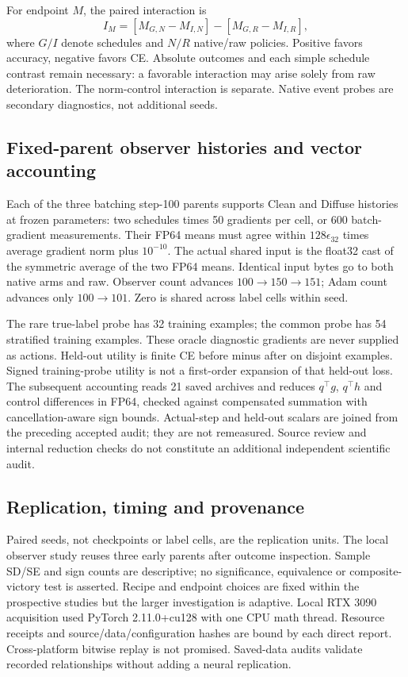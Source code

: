\documentclass[10pt]{article}
\begin{document}
For endpoint $M$, the paired interaction is
\begin{equation}
I_M=[M_{G,N}-M_{I,N}]-[M_{G,R}-M_{I,R}],
\end{equation}
where $G/I$ denote schedules and $N/R$ native/raw policies. Positive favors accuracy, negative favors CE. Absolute outcomes and each simple schedule contrast remain necessary: a favorable interaction may arise solely from raw deterioration. The norm-control interaction is separate. Native event probes are secondary diagnostics, not additional seeds.

\subsection{Fixed-parent observer histories and vector accounting}
Each of the three batching step-100 parents supports Clean and Diffuse histories at frozen parameters: two schedules times 50 gradients per cell, or 600 batch-gradient measurements. Their FP64 means must agree within $128\epsilon_{32}$ times average gradient norm plus $10^{-10}$. The actual shared input is the float32 cast of the symmetric average of the two FP64 means. Identical input bytes go to both native arms and raw. Observer count advances $100\to150\to151$; Adam count advances only $100\to101$. Zero is shared across label cells within seed.

The rare true-label probe has 32 training examples; the common probe has 54 stratified training examples. These oracle diagnostic gradients are never supplied as actions. Held-out utility is finite CE before minus after on disjoint examples. Signed training-probe utility is not a first-order expansion of that held-out loss. The subsequent accounting reads 21 saved archives and reduces $q^\top g$, $q^\top h$ and control differences in FP64, checked against compensated summation with cancellation-aware sign bounds. Actual-step and held-out scalars are joined from the preceding accepted audit; they are not remeasured. Source review and internal reduction checks do not constitute an additional independent scientific audit.

\subsection{Replication, timing and provenance}
Paired seeds, not checkpoints or label cells, are the replication units. The local observer study reuses three early parents after outcome inspection. Sample SD/SE and sign counts are descriptive; no significance, equivalence or composite-victory test is asserted. Recipe and endpoint choices are fixed within the prospective studies but the larger investigation is adaptive. Local RTX 3090 acquisition used PyTorch 2.11.0+cu128 with one CPU math thread. Resource receipts and source/data/configuration hashes are bound by each direct report. Cross-platform bitwise replay is not promised. Saved-data audits validate recorded relationships without adding a neural replication.
\end{document}
